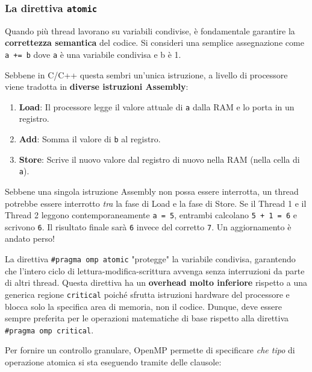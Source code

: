 \subsubsection*{La direttiva \texttt{atomic}}
Quando più thread lavorano su variabili condivise, è fondamentale garantire la \textbf{correttezza semantica} del codice. Si consideri una semplice assegnazione come \texttt{a += b} dove \texttt{a} è una variabile condivisa e b è 1. 

Sebbene in C/C++ questa sembri un'unica istruzione, a livello di processore viene tradotta in \textbf{diverse istruzioni Assembly}:
\begin{enumerate}
    \item \textbf{Load}: Il processore legge il valore attuale di \texttt{a} dalla RAM e lo porta in un registro.
    \item \textbf{Add}: Somma il valore di \texttt{b} al registro.
    \item \textbf{Store}: Scrive il nuovo valore dal registro di nuovo nella RAM (nella cella di \texttt{a}).
\end{enumerate}

\noindent
Sebbene una singola istruzione Assembly non possa essere interrotta, un thread potrebbe essere interrotto \textit{tra} la fase di Load e la fase di Store. Se il Thread 1 e il Thread 2 leggono contemporaneamente \texttt{a = 5}, entrambi calcolano \texttt{5 + 1 = 6} e scrivono \texttt{6}. Il risultato finale sarà \texttt{6} invece del corretto \texttt{7}. Un aggiornamento è andato perso!

La direttiva \texttt{\#pragma omp atomic} "protegge" la variabile condivisa, garantendo che l'intero ciclo di lettura-modifica-scrittura avvenga senza interruzioni da parte di altri thread. Questa direttiva ha un \textbf{overhead molto inferiore} rispetto a una generica regione \texttt{critical} poiché sfrutta istruzioni hardware del processore e blocca solo la specifica area di memoria, non il codice. Dunque, deve essere sempre preferita per le operazioni matematiche di base rispetto alla direttiva \texttt{\#pragma omp critical}.

Per fornire un controllo granulare, OpenMP permette di specificare \textit{che tipo} di operazione atomica si sta eseguendo tramite delle clausole:

